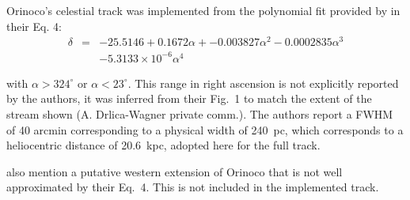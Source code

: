 Orinoco's celestial track was implemented from the polynomial fit provided by \citet{Grillmair2017_south} in their Eq. 4:
\begin{eqnarray*}
\delta &=& -25.5146 + 0.1672\alpha + -0.003827\alpha^2 -0.0002835\alpha^3 \\
       & & -5.3133\times 10^{-6}\alpha^4
\end{eqnarray*}

with $\alpha>324^\circ$ or $\alpha<23^\circ$. This range in right ascension is not explicitly reported by the authors,
it was inferred from their Fig.~1 to match the extent of the stream shown (A. Drlica-Wagner private comm.).
The authors report a FWHM of 40 arcmin corresponding to a physical width of 240~pc, which corresponds to a heliocentric distance of 20.6~kpc, adopted here for the full track.

\citet{Grillmair2017_south} also mention a putative western extension of Orinoco that is not well approximated by their Eq.~4. This is not included in the implemented track.
